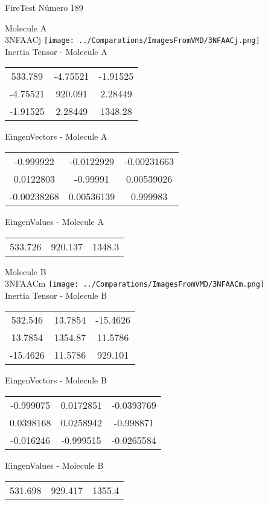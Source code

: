 \vtab[-2cm]
\begin{center}
{\large FireTest \tab Número 189}
\end{center}
\begin{multicols}{2}
\begin{center}

Molecule A \\ 
3NFAACj
\texttt{[image: ../Comparations/ImagesFromVMD/3NFAACj.png]}
\\
Inertia Tensor - Molecule A \\
\vtab

\begin{tabular}{|c c c|}
533.789	 & 	-4.75521	 & 	-1.91525	 \\
-4.75521	 & 	920.091	 & 	2.28449	 \\
-1.91525	 & 	2.28449	 & 	1348.28
\end{tabular}

\vtab
 EingenVectors - Molecule A     \\
\vtab
\begin{tabular}{|c c c|}
-0.999922	 & 	-0.0122929	 & 	-0.00231663	 \\
0.0122803	 & 	-0.99991	 & 	0.00539026	 \\
-0.00238268	 & 	0.00536139	 & 	0.999983
\end{tabular}

\vtab
 EingenValues - Molecule A     \\
\vtab
\begin{tabular}{|c c c|}
533.726	 & 	920.137	 & 	1348.3	 \\
\end{tabular}
\columnbreak

Molecule B \\ 
3NFAACm
\texttt{[image: ../Comparations/ImagesFromVMD/3NFAACm.png]}
\\
Inertia Tensor - Molecule B \\
\vtab

\begin{tabular}{|c c c|}
532.546	 & 	13.7854	 & 	-15.4626	 \\
13.7854	 & 	1354.87	 & 	11.5786	 \\
-15.4626	 & 	11.5786	 & 	929.101
\end{tabular}

\vtab
 EingenVectors - Molecule B     \\
\vtab
\begin{tabular}{|c c c|}
-0.999075	 & 	0.0172851	 & 	-0.0393769	 \\
0.0398168	 & 	0.0258942	 & 	-0.998871	 \\
-0.016246	 & 	-0.999515	 & 	-0.0265584
\end{tabular}

\vtab
 EingenValues - Molecule B     \\
\vtab
\begin{tabular}{|c c c|}
531.698	 & 	929.417	 & 	1355.4	 \\
\end{tabular}

\end{center}
\end{multicols}
